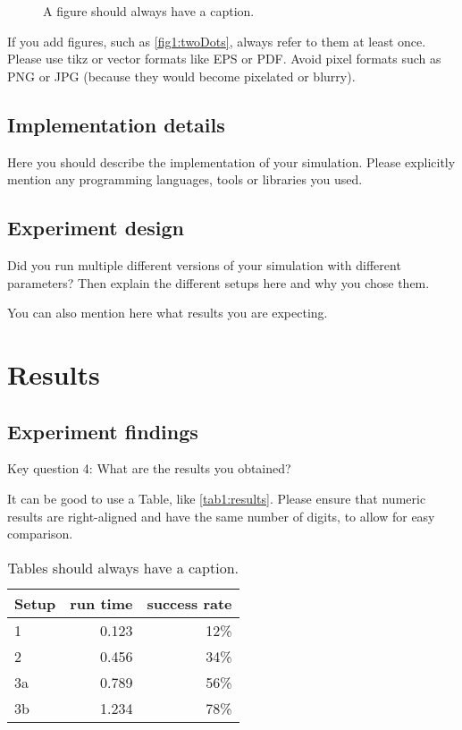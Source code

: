 \documentclass[a4paper,11pt]{article}
\begin{document}
\begin{figure}[h]
  \centering
  \caption{A figure should always have a caption.}\label{fig1:twoDots}
\end{figure}

If you add figures, such as \autoref{fig1:twoDots}, always refer to them at least once.
Please use tikz or vector formats like EPS or PDF.
Avoid pixel formats such as PNG or JPG (because they would become pixelated or blurry).

\subsection{Implementation details}

Here you should describe the implementation of your simulation.
Please explicitly mention any programming languages, tools or libraries you used.

\subsection{Experiment design}

Did you run multiple different versions of your simulation with different parameters?
Then explain the different setups here and why you chose them.

You can also mention here what results you are expecting.

\section{Results}

\subsection{Experiment findings}

Key question 4: What are the results you obtained?

It can be good to use a Table, like \autoref{tab1:results}.
Please ensure that numeric results are right-aligned and have the same number of digits, to allow for easy comparison.

\begin{table}[h]
  \centering
  \begin{tabular}{lrr}
    \toprule
    Setup & run time & success rate \\
    \midrule
    1  & 0.123 & 12\% \\
    2  & 0.456 & 34\% \\
    3a & 0.789 & 56\% \\
    3b & 1.234 & 78\% \\
    \bottomrule
  \end{tabular}
  \caption{Tables should always have a caption.}\label{tab1:results}
\end{table}
\end{document}
